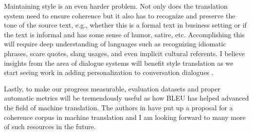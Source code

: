 Maintaining style is an even harder problem. Not only does the translation system need to ensure coherence but it also has to recognize and preserve the tone of the source text, e.g., whether this is a formal text in business setting or if the text is informal and has some sense of humor, satire, etc. Accomplishing this will require deep understanding of languages such as recognizing idiomatic phrases, scare quotes, slang usages, and even implicit cultural referents. I believe insights from the area of dialogue systems will benefit style translation as we start seeing work in adding personalization to conversation dialogues \cite{li16,alrfou16}.

Lastly, to make our progress measurable, evaluation datasets and proper automatic metrics will be tremendously useful as how BLEU \cite{Papineni02bleu} has helped advanced the field of machine translation. The authors in \cite{smith15} have put up a proposal for a coherence corpus in machine translation and I am looking forward to many more of such resources in the future.
